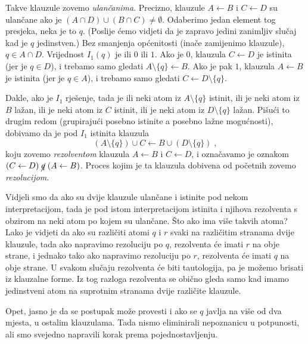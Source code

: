 Takve klauzule zovemo \emph{ulančanima}. Precizno, klauzule $A\leftarrow B$ i $C\leftarrow D$ su ulančane ako je $(A\cap D)\cup(B\cap C)\not=\emptyset$. Odaberimo jedan element tog presjeka, neka je to $q$. (Poslije ćemo vidjeti da je zapravo jedini zanimljiv slučaj kad je $q$ jedinstven.) Bez smanjenja općenitosti (inače zamijenimo klauzule), $q\in A\cap D$. Vrijednost $I_1(q)$ je ili $0$ ili $1$. Ako je $0$, klauzula $C\leftarrow D$ je istinita (jer je $q\in D$), i trebamo samo gledati $A\setminus\{q\}\leftarrow B$. Ako je pak $1$, klauzula $A\leftarrow B$ je istinita (jer je $q\in A$), i trebamo samo gledati $C\leftarrow D\setminus\{q\}$.

Dakle, ako je $I_1$ rješenje, tada je ili neki atom iz $A\setminus\{q\}$ istinit, ili je neki atom iz $B$ lažan, ili je neki atom iz $C$ istinit, ili je neki atom iz $D\setminus\{q\}$ lažan. Pišući to drugim redom (grupirajući posebno istinite a posebno lažne mogućnosti), dobivamo da je pod $I_1$ istinita klauzula $$(A\setminus\{q\})\cup C\leftarrow B\cup(D\setminus\{q\})\;,$$
koju zovemo \emph{rezolventom} klauzula $A\leftarrow B$ i $C\leftarrow D$, i označavamo je oznakom $(C\leftarrow D)\;\cancel{q}\;(A\leftarrow B)$. Proces kojim je ta klauzula dobivena od početnih zovemo \emph{rezolucijom}.

Vidjeli smo da ako su dvije klauzule ulančane i istinite pod nekom interpretacijom, tada je pod istom interpretacijom istinita i njihova rezolventa s obzirom na neki atom po kojem su ulančane. Što ako ima više takvih atoma? Lako je vidjeti da ako su različiti atomi $q$ i $r$ svaki na različitim stranama dvije klauzule, tada ako napravimo rezoluciju po $q$, rezolventa će imati $r$ na obje strane, i jednako tako ako napravimo rezoluciju po $r$, rezolventa će imati $q$ na obje strane. U svakom slučaju rezolventa će biti tautologija, pa je možemo brisati iz klauzalne forme. Iz tog razloga rezolventa se obično gleda samo kad imamo jedinstveni atom na suprotnim stranama dvije različite klauzule.

Opet, jasno je da se postupak može provesti i ako se $q$ javlja na više od dva mjesta, u ostalim klauzulama. Tada nismo eliminirali nepoznanicu u potpunosti, ali smo svejedno napravili korak prema pojednostavljenju.